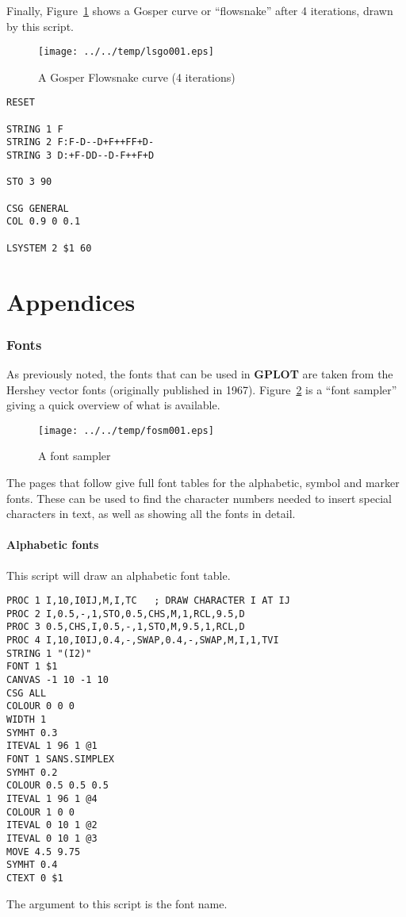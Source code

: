 \documentclass[a4paper,twoside,11pt]{article}
\makeatletter
\def\maxwidth{%
  \ifdim\Gin@nat@width>\linewidth
    \linewidth
  \else
    \Gin@nat@width
  \fi
}
\newcommand{\newpara}{\par\vspace{4mm}\noindent}
\makeatother
\begin{document}
\newpara
Finally, Figure~\ref{fig:lsgo001} shows a Gosper curve or ``flowsnake''
after 4 iterations, drawn by this script.

\begin{figure}
  \centering
  \texttt{[image: ../../temp/lsgo001.eps]}
  \caption{A Gosper Flowsnake curve (4 iterations)}
  \label{fig:lsgo001}
\end{figure}

\begin{lstlisting}
RESET

STRING 1 F
STRING 2 F:F-D--D+F++FF+D-
STRING 3 D:+F-DD--D-F++F+D

STO 3 90

CSG GENERAL
COL 0.9 0 0.1

LSYSTEM 2 $1 60
\end{lstlisting}

\clearpage
\part{Appendices}
\clearpage

\section{Fonts}
\newpara
As previously noted, the fonts that can be used in \textbf{GPLOT} are taken
from the Hershey vector fonts (originally published in 1967).
Figure~\ref{fig:fosm001} is a ``font sampler'' giving a quick overview
of what is available.

\begin{figure}
  \centering
  \texttt{[image: ../../temp/fosm001.eps]}
  \caption{A font sampler}
  \label{fig:fosm001}
\end{figure}

\newpara
The pages that follow give full font tables for the
alphabetic, symbol and marker fonts. These can be used to
find the character numbers needed to insert special characters
in text, as well as showing all the fonts in detail.

\subsection{Alphabetic fonts}
This script will draw an alphabetic font table.
\begin{lstlisting}
PROC 1 I,10,I0IJ,M,I,TC   ; DRAW CHARACTER I AT IJ
PROC 2 I,0.5,-,1,STO,0.5,CHS,M,1,RCL,9.5,D
PROC 3 0.5,CHS,I,0.5,-,1,STO,M,9.5,1,RCL,D
PROC 4 I,10,I0IJ,0.4,-,SWAP,0.4,-,SWAP,M,I,1,TVI
STRING 1 "(I2)"
FONT 1 $1 
CANVAS -1 10 -1 10
CSG ALL
COLOUR 0 0 0
WIDTH 1
SYMHT 0.3 
ITEVAL 1 96 1 @1
FONT 1 SANS.SIMPLEX 
SYMHT 0.2 
COLOUR 0.5 0.5 0.5
ITEVAL 1 96 1 @4
COLOUR 1 0 0
ITEVAL 0 10 1 @2
ITEVAL 0 10 1 @3
MOVE 4.5 9.75
SYMHT 0.4
CTEXT 0 $1
\end{lstlisting}
The argument to this script is the font name.
\end{document}
